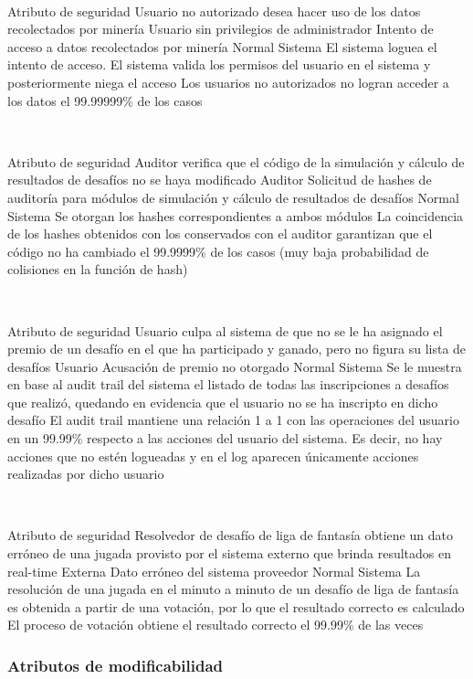 ~

\escenario
{Atributo de seguridad}
{Usuario no autorizado desea hacer uso de los datos recolectados por minería}
{Usuario sin privilegios de administrador}
{Intento de acceso a datos recolectados por minería}
{Normal}
{Sistema}
{El sistema loguea el intento de acceso. El sistema valida los permisos del usuario en el sistema y posteriormente niega el acceso}
{Los usuarios no autorizados no logran acceder a los datos el 99.99999\% de los casos}

~

\escenario
{Atributo de seguridad}
{Auditor verifica que el código de la simulación y cálculo de resultados de desafíos no se haya modificado}
{Auditor}
{Solicitud de hashes de auditoría para módulos de simulación y cálculo de resultados de desafíos}
{Normal}
{Sistema}
{Se otorgan los hashes correspondientes a ambos módulos}
{La coincidencia de los hashes obtenidos con los conservados con el auditor garantizan que el código no ha cambiado el 99.9999\% de los casos (muy baja probabilidad de colisiones en la función de hash)}

~

\escenario
{Atributo de seguridad}
{Usuario culpa al sistema de que no se le ha asignado el premio de un desafío en el que ha participado y ganado, pero no figura su lista de desafíos}
{Usuario}
{Acusación de premio no otorgado}
{Normal}
{Sistema}
{Se le muestra en base al audit trail del sistema el listado de todas las inscripciones a desafíos que realizó, quedando en evidencia que el usuario no se ha inscripto en dicho desafío}
{El audit trail mantiene una relación 1 a 1 con las operaciones del usuario en un 99.99\% respecto a las acciones del usuario del sistema. Es decir, no hay acciones que no estén logueadas y en el log aparecen únicamente acciones realizadas por dicho usuario}

~

\escenario
{Atributo de seguridad}
{Resolvedor de desafío de liga de fantasía obtiene un dato erróneo de una jugada provisto por el sistema externo que brinda resultados en real-time}
{Externa}
{Dato erróneo del sistema proveedor}
{Normal}
{Sistema}
{La resolución de una jugada en el minuto a minuto de un desafío de liga de fantasía es obtenida a partir de una votación, por lo que el resultado correcto es calculado}
{El proceso de votación obtiene el resultado correcto el 99.99\% de las veces}

\subsubsection{Atributos de modificabilidad}

